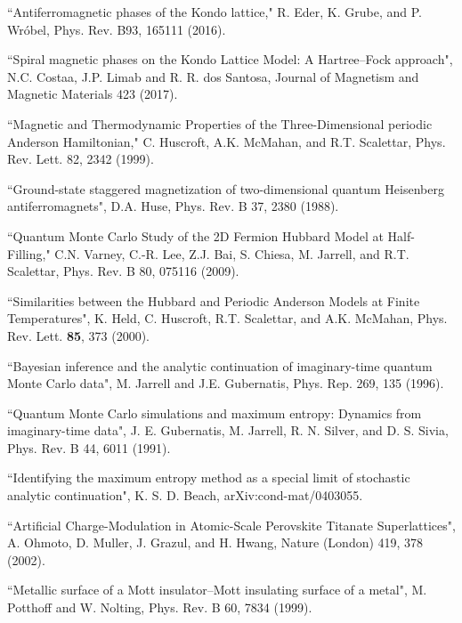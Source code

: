 \documentclass[pra,letterpaper,10pt,twocolumn]{revtex4}
\begin{document}
\begin{thebibliography}{100}
``Antiferromagnetic phases of the Kondo lattice,"
R. Eder, K. Grube, and P. Wr\'obel,
Phys. Rev. B93, 165111 (2016).


``Spiral magnetic phases on the Kondo Lattice Model: A Hartree–Fock approach",
N.C. Costaa, J.P. Limab and R. R. dos Santosa, Journal of Magnetism and Magnetic Materials 423 (2017).

``Magnetic and Thermodynamic Properties of the Three-Dimensional
periodic Anderson Hamiltonian,"
C. Huscroft, A.K. McMahan, and R.T. Scalettar, Phys. Rev. Lett. 82, 
2342 (1999).

``Ground-state staggered magnetization of two-dimensional quantum Heisenberg antiferromagnets",
D.A. Huse, Phys. Rev. B 37, 2380 (1988). 

``Quantum Monte Carlo Study of the 2D Fermion Hubbard
Model at Half-Filling,"
C.N. Varney, C.-R. Lee, Z.J. Bai, S. Chiesa, M. Jarrell, and 
R.T. Scalettar, Phys. Rev. B 80, 075116 (2009).

``Similarities between  the Hubbard and Periodic
Anderson Models at  Finite Temperatures",
K. Held, C. Huscroft, R.T. Scalettar, and A.K. McMahan,
Phys. Rev. Lett. {\bf 85}, 373 (2000).

``Bayesian inference and the analytic continuation of imaginary-time quantum Monte Carlo data",
M. Jarrell and J.E. Gubernatis,
Phys. Rep. 269, 135 (1996).

``Quantum Monte Carlo simulations and maximum entropy: Dynamics from imaginary-time data",
J. E. Gubernatis, M. Jarrell, R. N. Silver, and D. S. Sivia, Phys. Rev. B 44, 6011 (1991).

``Identifying the maximum entropy method as a special limit of stochastic analytic continuation",
K. S. D. Beach, arXiv:cond-mat/0403055.

``Artificial Charge-Modulation in Atomic-Scale Perovskite Titanate Superlattices",
A. Ohmoto, D. Muller, J. Grazul, and H. Hwang,
Nature (London) 419, 378 (2002).

``Metallic surface of a Mott insulator–Mott insulating surface of a metal",
M. Potthoff and W. Nolting,
Phys. Rev. B 60, 7834 (1999).


\end{thebibliography}
\end{document}
